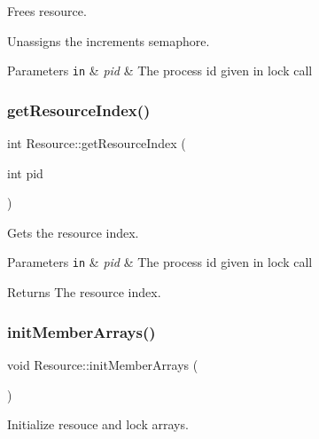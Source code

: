 Frees resource. 

Unassigns the increments semaphore.


\begin{DoxyParams}[1]{Parameters}
\mbox{\tt in}  & {\em pid} & The process id given in lock call \\
\hline
\end{DoxyParams}
\hypertarget{class_resource_a8d29438e770b809c58a646c0b527971b}{}\label{class_resource_a8d29438e770b809c58a646c0b527971b} 
\subsubsection{\texorpdfstring{get\+Resource\+Index()}{getResourceIndex()}}
{\footnotesize\ttfamily int Resource\+::get\+Resource\+Index (\begin{DoxyParamCaption}\item[{int}]{pid }\end{DoxyParamCaption})}



Gets the resource index. 


\begin{DoxyParams}[1]{Parameters}
\mbox{\tt in}  & {\em pid} & The process id given in lock call\\
\hline
\end{DoxyParams}
\begin{DoxyReturn}{Returns}
The resource index. 
\end{DoxyReturn}
\hypertarget{class_resource_a7af655f2da504607f1d35708dc479987}{}\label{class_resource_a7af655f2da504607f1d35708dc479987} 
\subsubsection{\texorpdfstring{init\+Member\+Arrays()}{initMemberArrays()}}
{\footnotesize\ttfamily void Resource\+::init\+Member\+Arrays (\begin{DoxyParamCaption}{ }\end{DoxyParamCaption})\hspace{0.3cm}{\ttfamily [private]}}



Initialize resouce and lock arrays. 

